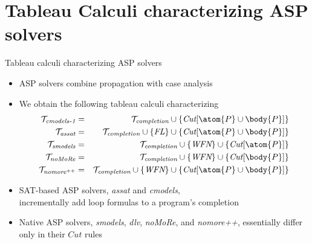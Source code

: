 \section{Tableau Calculi characterizing ASP solvers}
\begin{frame}{Tableau calculi characterizing ASP solvers}
  \begin{itemize}
  \item <1-> ASP solvers combine propagation with case analysis
  \item <2-> We obtain the following tableau calculi characterizing
    \begin{eqnarray*}
      {\mathcal{T}}_{\textit{cmodels-1}}
      & = &
      {\mathcal{T}}_{\textit{completion}} \cup \{\textit{Cut}[\atom{P} \cup \body{P}]\} \\
      {\mathcal{T}}_{\textit{assat}}
      & = &
      {\mathcal{T}}_{\textit{completion}} \cup \{\textit{FL}\} \cup \{\textit{Cut}[\atom{P} \cup \body{P}]\}  \\
      {\mathcal{T}}_{\textit{smodels}}
      & = &
      {\mathcal{T}}_{\textit{completion}} \cup \{\textit{WFN}\}\cup \{\textit{Cut}[\atom{P}]\} \\
      {\mathcal{T}}_{\textit{noMoRe}}
      & = &
      {\mathcal{T}}_{\textit{completion}} \cup \{\textit{WFN}\}\cup \{\textit{Cut}[\body{P}]\} \\
      {\mathcal{T}}_{\textit{nomore}^{++}}
      & = &
      {\mathcal{T}}_{\textit{completion}} \cup \{\textit{WFN}\}\cup \{\textit{Cut}[\atom{P} \cup \body{P}]\}
    \end{eqnarray*}
  \item<3-> SAT-based ASP solvers,
        \textit{assat} and \textit{cmodels},\\
        incrementally add loop formulas to a program's completion
  \item<4->  Native ASP solvers,
        \textit{smodels}, \textit{dlv}, \textit{noMoRe}, and \textit{nomore++},
        essentially differ only in their $\textit{Cut}$ rules
  \end{itemize}
\end{frame}
